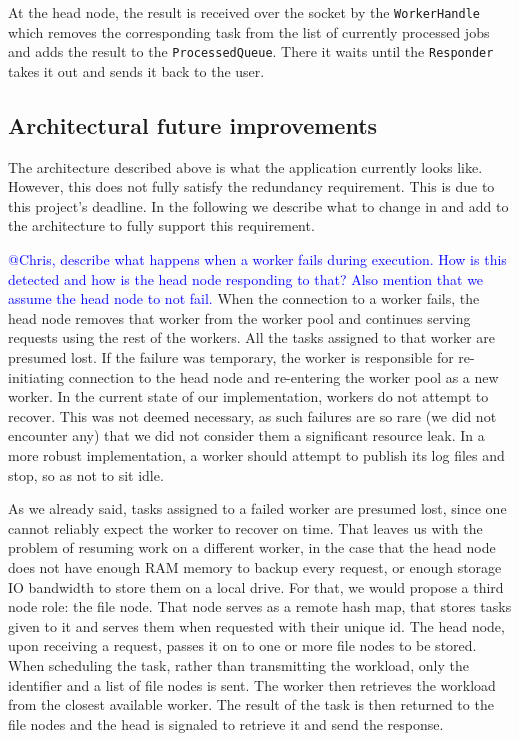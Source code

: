 \documentclass{stylesheet}
\begin{document}
At the head node, the result is received over the socket  by the \texttt{WorkerHandle} which removes the corresponding task from the list of currently processed jobs and adds the result to the \texttt{ProcessedQueue}. There it waits until the \texttt{Responder} takes it out and sends it back to the user.

\subsection{Architectural future improvements}
The architecture described above is what the application currently looks like. However, this does not fully satisfy the redundancy requirement. This is due to this project's deadline. In the following we describe what to change in and add to the architecture to fully support this requirement.

\textcolor{blue}{@Chris, describe what happens when a worker fails during execution. How is this detected and how is the head node responding to that? Also mention that we assume the head node to not fail.}
When the connection to a worker fails, the head node removes that worker from the worker pool and continues serving requests using the rest of the workers. All the tasks assigned to that worker are presumed lost. If the failure was temporary, the worker is responsible for re-initiating connection to the head node and re-entering the worker pool as a new worker. In the current state of our implementation, workers do not attempt to recover. This was not deemed necessary, as such failures are so rare (we did not encounter any) that we did not consider them a significant resource leak. In a more robust implementation, a worker should attempt to publish its log files and stop, so as not to sit idle.

As we already said, tasks assigned to a failed worker are presumed lost, since one cannot reliably expect the worker to recover on time. That leaves us with the problem of resuming work on a different worker, in the case that the head node does not have enough RAM memory to backup every request, or enough storage IO bandwidth to store them on a local drive. For that, we would propose a third node role: the file node. That node serves as a remote hash map, that stores tasks given to it and serves them when requested with their unique id. The head node, upon receiving a request, passes it on to one or more file nodes to be stored. When scheduling the task, rather than transmitting the workload, only the identifier and a list of file nodes is sent. The worker then retrieves the workload from the closest available worker. The result of the task is then returned to the file nodes and the head is signaled to retrieve it and send the response.
\end{document}
